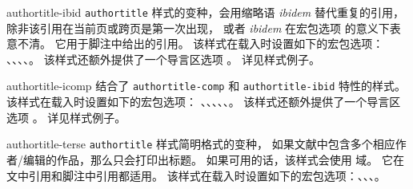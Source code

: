 \begin{marglist}
\item[authortitle-ibid]
\texttt{authortitle} 样式的变种，会用缩略语 \emph{ibidem} 替代重复的引用，
除非该引用在当前页或跨页是第一次出现，
或者 \emph{ibidem} 在宏包选项  的意义下表意不清。
它用于脚注中给出的引用。
该样式在载入时设置如下的宏包选项：
、、、、。
该样式还额外提供了一个导言区选项 。
详见样式例子。

\item[authortitle-icomp]
结合了 \texttt{authortitle-comp} 和 \texttt{authortitle-ibid} 特性的样式。
该样式在载入时设置如下的宏包选项：
、、、、、。
该样式还额外提供了一个导言区选项 。
详见样式例子。

\item[authortitle-terse]
\texttt{authortitle} 样式简明格式的变种，
如果文献中包含多个相应作者/编辑的作品，那么只会打印出标题。
如果可用的话，该样式会使用  域。
它在文中引用和脚注中引用都适用。
该样式在载入时设置如下的宏包选项：、、、。


\end{marglist}
